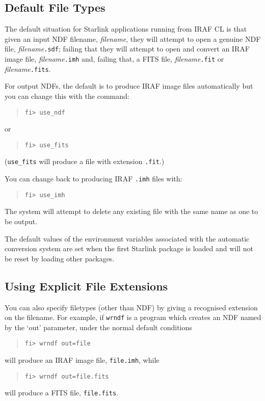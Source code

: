\documentclass[twoside,11pt]{article}
\newcommand{\xlabel}[1]{}
\begin{document}
\subsection{\xlabel{default_file_types}Default File Types}
The default situation for Starlink applications running from IRAF CL is that
given an input NDF filename, \textit{filename}, they will attempt to open a
genuine NDF file, \textit{filename}{\texttt{.sdf}}; failing that they will
attempt to open and convert an IRAF image file,
\textit{filename}{\texttt{.imh}} and, failing that, a FITS file,
\textit{filename}{\texttt{.fit}} or \textit{filename}{\texttt{.fits}}.

For output NDFs, the default is to produce IRAF image files automatically but
you can change this with the command:
\begin{quote} \begin{verbatim}
fi> use_ndf
\end{verbatim} \end{quote}
or
\begin{quote} \begin{verbatim}
fi> use_fits
\end{verbatim} \end{quote}
(\texttt{use\_fits} will produce a file with extension \texttt{.fit}.)

You can change back to producing IRAF \texttt{.imh} files with:
\begin{quote} \begin{verbatim}
fi> use_imh
\end{verbatim} \end{quote}

The system will attempt to delete any existing file with the same name as one
to be output.

The default values of the environment variables associated with the automatic
conversion system are set when the first Starlink package is loaded and will
not be reset by loading other packages.

\subsection{\xlabel{using_explicit_file_extensions}Using Explicit File Extensions}
You can also specify filetypes (other than NDF) by giving a recognised
extension on the filename. For example, if \texttt{wrndf} is a program which
creates an NDF named by the `out' parameter, under the normal default conditions
\begin{quote} \begin{verbatim}
fi> wrndf out=file
\end{verbatim} \end{quote}
will produce an IRAF image file, \texttt{file.imh}, while
\begin{quote} \begin{verbatim}
fi> wrndf out=file.fits
\end{verbatim} \end{quote}
will produce a FITS file, \texttt{file.fits}.
\end{document}
